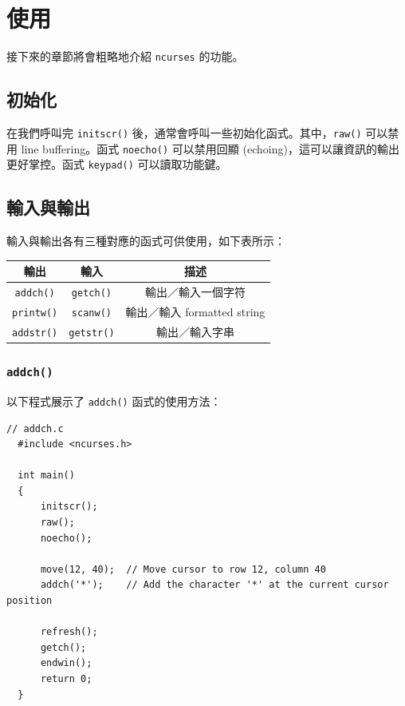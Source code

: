 \documentclass[12pt]{article}
\theoremstyle{definition}
\begin{document}
\section{使用}
\noindent
接下來的章節將會粗略地介紹 \texttt{ncurses} 的功能。

\subsection{初始化}
\noindent
在我們呼叫完 \texttt{initscr()} 後，通常會呼叫一些初始化函式。其中，\texttt{raw()} 可以禁用 line buffering。函式 \texttt{noecho()} 可以禁用回顯 (echoing)，這可以讓資訊的輸出更好掌控。函式 \texttt{keypad()} 可以讀取功能鍵。

\subsection{輸入與輸出}
\noindent
輸入與輸出各有三種對應的函式可供使用，如下表所示：
\begin{center}
    \begin{tabular}{|c|c|c|}
        \hline
        \textbf{輸出} & \textbf{輸入} & \textbf{描述} \\
        \hline\hline
        \texttt{addch()} & \texttt{getch()} & 輸出／輸入一個字符 \\
        \hline
        \texttt{printw()} & \texttt{scanw()} & 輸出／輸入 formatted string \\
        \hline
        \texttt{addstr()} & \texttt{getstr()} & 輸出／輸入字串 \\
        \hline
    \end{tabular}
\end{center}

\subsubsection{\texttt{addch()}}
\noindent
以下程式展示了 \texttt{addch()} 函式的使用方法：
\begin{lstlisting}[style=C]
  // addch.c
  #include <ncurses.h>

  int main()
  {
      initscr();
      raw();
      noecho();
    
      move(12, 40);  // Move cursor to row 12, column 40
      addch('*');    // Add the character '*' at the current cursor position
    
      refresh();
      getch();
      endwin();
      return 0;
  }
\end{lstlisting}
\end{document}
